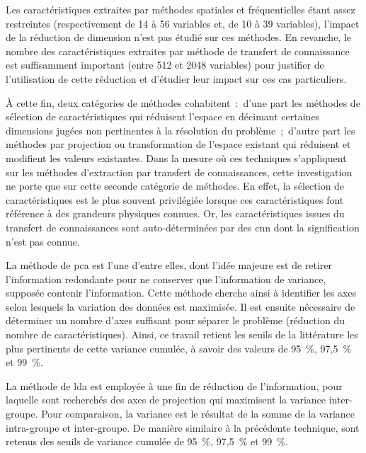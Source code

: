 Les caractéristiques extraites par méthodes spatiales et fréquentielles étant assez restreintes (respectivement de 14 à 56 variables et, de 10 à 39 variables), l'impact de la réduction de dimension n'est pas étudié sur ces méthodes. En revanche, le nombre des caractéristiques extraites par méthode de transfert de connaissance est suffisamment important (entre 512 et 2048 variables) pour justifier de l'utilisation de cette réduction et d'étudier leur impact sur ces cas particuliers.\par

À cette fin, deux catégories de méthodes cohabitent~:~d'une part les méthodes de sélection de caractéristiques qui réduisent l'espace en décimant certaines dimensions jugées non pertinentes à la résolution du problème~;~d'autre part les méthodes par projection ou transformation de l'espace existant qui réduisent et modifient les valeurs existantes. Dans la mesure où ces techniques s'appliquent sur les méthodes d'extraction par transfert de connaissances, cette investigation ne porte que sur cette seconde catégorie de méthodes. En effet, la sélection de caractéristiques est le plus souvent privilégiée lorsque ces caractéristiques font référence à des grandeurs physiques connues. Or, les caractéristiques issues du transfert de connaissances sont auto-déterminées par des \gls{cnn} dont la signification n'est pas connue.\par

La méthode de \gls{pca} est l'une d'entre elles, dont l'idée majeure est de retirer l'information redondante pour ne conserver que l'information de variance, supposée contenir l'information. Cette méthode cherche ainsi à identifier les axes selon lesquels la variation des données est maximisée. Il est ensuite nécessaire de déterminer un nombre d'axes suffisant pour séparer le problème (réduction du nombre de caractéristiques). Ainsi, ce travail retient les seuils de la littérature les plus pertinents de cette variance cumulée, à savoir des valeurs de 95~\%, 97,5~\% et 99~\%.\par

La méthode de \gls{lda} est employée à une fin de réduction de l'information, pour laquelle sont recherchés des axes de projection qui maximisent la variance inter-groupe. Pour comparaison, la variance est le résultat de la somme de la variance intra-groupe et inter-groupe. De manière similaire à la précédente technique, sont retenus des seuils de variance cumulée de 95~\%, 97,5~\% et 99~\%.\par

